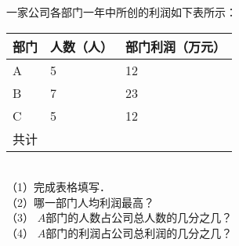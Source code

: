 
一家公司各部门一年中所创的利润如下表所示：\\
\begin{tabular}{|l|l|l|}
	\hline
	部门\hspace{4em} & 人数（人） &  部门利润（万元）  \\ \hline
	A & 5 & 12 \\ \hline
	B & 7 &  23  \\ \hline
	C & 5 & 12 \\ \hline
	共计 &   &     \\ \hline
\end{tabular}\\
（1）完成表格填写．\\
（2）哪一部门人均利润最高？\\
（3） $A$部门的人数占公司总人数的几分之几？\\
（4） $A$部门的利润占公司总利润的几分之几？\\

